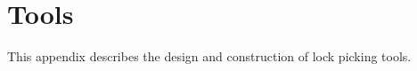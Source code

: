 \appendix
\chapter{Tools}
This appendix describes the design and construction of lock picking tools. 
